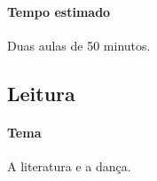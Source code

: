 \documentclass[12pt]{extarticle}
\begin{document}
\paragraph{Tempo estimado} Duas aulas de 50 minutos.


\subsection{Leitura}






\paragraph{Tema} A literatura e a dança.
\end{document}
